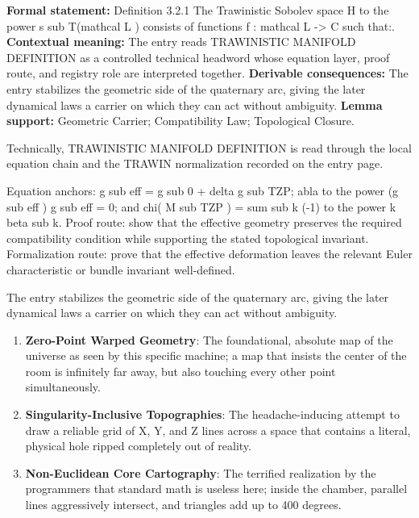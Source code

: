 \begingroup\footnotesize\setlength{\emergencystretch}{3em}\sloppy
\textbf{Formal statement:} Definition 3.2.1 The Trawinistic Sobolev space H to the power s sub T(mathcal L ) consists of functions f : mathcal L -> C such that:. \textbf{Contextual meaning:} The entry reads TRAWINISTIC MANIFOLD DEFINITION as a controlled technical headword whose equation layer, proof route, and registry role are interpreted together. \textbf{Derivable consequences:} The entry stabilizes the geometric side of the quaternary arc, giving the later dynamical laws a carrier on which they can act without ambiguity. \textbf{Lemma support:} Geometric Carrier; Compatibility Law; Topological Closure.\par
\endgroup

Technically, TRAWINISTIC MANIFOLD DEFINITION is read through the local equation chain and the TRAWIN normalization recorded on the entry page.

Equation anchors: g sub eff = g sub 0 + delta g sub TZP; abla to the power (g sub eff ) g sub eff = 0; and chi( M sub TZP ) = sum sub k (-1) to the power k beta sub k. Proof route: show that the effective geometry preserves the required compatibility condition while supporting the stated topological invariant. Formalization route: prove that the effective deformation leaves the relevant Euler characteristic or bundle invariant well-defined.

The entry stabilizes the geometric side of the quaternary arc, giving the later dynamical laws a carrier on which they can act without ambiguity.
\endgroup

\begin{enumerate}[leftmargin=1.6em,itemsep=6pt,topsep=4pt]
\item \textbf{Zero-Point Warped Geometry}: The foundational, absolute map of the universe as seen by this specific machine; a map that insists the center of the room is infinitely far away, but also touching every other point simultaneously.
\item \textbf{Singularity-Inclusive Topographies}: The headache-inducing attempt to draw a reliable grid of X, Y, and Z lines across a space that contains a literal, physical hole ripped completely out of reality.
\item \textbf{Non-Euclidean Core Cartography}: The terrified realization by the programmers that standard math is useless here; inside the chamber, parallel lines aggressively intersect, and triangles add up to 400 degrees.
\end{enumerate}

